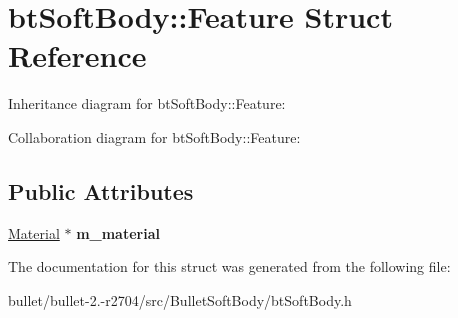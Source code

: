 \hypertarget{structbt_soft_body_1_1_feature}{\section{bt\+Soft\+Body\+:\+:Feature Struct Reference}
\label{structbt_soft_body_1_1_feature}
}


Inheritance diagram for bt\+Soft\+Body\+:\+:Feature\+:


Collaboration diagram for bt\+Soft\+Body\+:\+:Feature\+:
\subsection*{Public Attributes}
\begin{DoxyCompactItemize}
\item 
\hypertarget{structbt_soft_body_1_1_feature_ae24af9323abfd07bc80ad26634c1b360}{\hyperlink{structbt_soft_body_1_1_material}{Material} $\ast$ {\bfseries m\+\_\+material}}\label{structbt_soft_body_1_1_feature_ae24af9323abfd07bc80ad26634c1b360}

\end{DoxyCompactItemize}


The documentation for this struct was generated from the following file\+:\begin{DoxyCompactItemize}
\item 
bullet/bullet-\/2.-\/r2704/src/\+Bullet\+Soft\+Body/bt\+Soft\+Body.\+h\end{DoxyCompactItemize}
